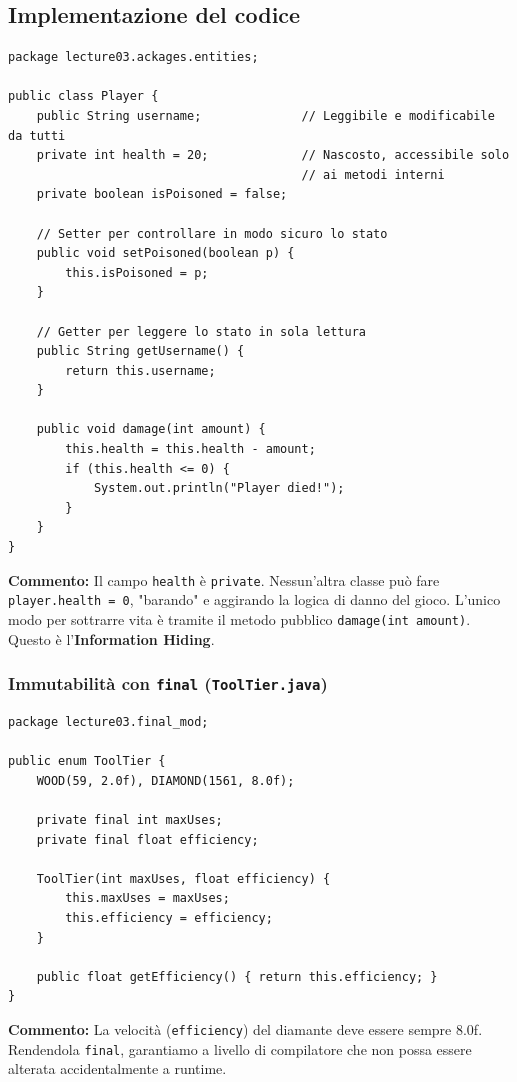 \documentclass[12pt, a4paper]{article}
\begin{document}
\newpage

\subsection{Implementazione del codice}


\begin{verbatim}
package lecture03.ackages.entities;

public class Player {
    public String username;              // Leggibile e modificabile da tutti
    private int health = 20;             // Nascosto, accessibile solo 
                                         // ai metodi interni
    private boolean isPoisoned = false;
    
    // Setter per controllare in modo sicuro lo stato
    public void setPoisoned(boolean p) {
        this.isPoisoned = p;
    }
    
    // Getter per leggere lo stato in sola lettura
    public String getUsername() {
        return this.username;
    }

    public void damage(int amount) {
        this.health = this.health - amount;
        if (this.health <= 0) {
            System.out.println("Player died!");
        }
    }
}
\end{verbatim}
\textbf{Commento:} Il campo \texttt{health} è \texttt{private}. Nessun'altra classe può fare \texttt{player.health = 0}, "barando" e aggirando la logica di danno del gioco. L'unico modo per sottrarre vita è tramite il metodo pubblico \texttt{damage(int amount)}. Questo è l'\textbf{Information Hiding}.

\subsubsection{Immutabilità con \texttt{final} (\texttt{ToolTier.java})}
\begin{verbatim}
package lecture03.final_mod;

public enum ToolTier {
    WOOD(59, 2.0f), DIAMOND(1561, 8.0f);

    private final int maxUses;
    private final float efficiency;

    ToolTier(int maxUses, float efficiency) {
        this.maxUses = maxUses;
        this.efficiency = efficiency;
    }

    public float getEfficiency() { return this.efficiency; }
}
\end{verbatim}
\textbf{Commento:} La velocità (\texttt{efficiency}) del diamante deve essere sempre 8.0f. Rendendola \texttt{final}, garantiamo a livello di compilatore che non possa essere alterata accidentalmente a runtime.
\end{document}
